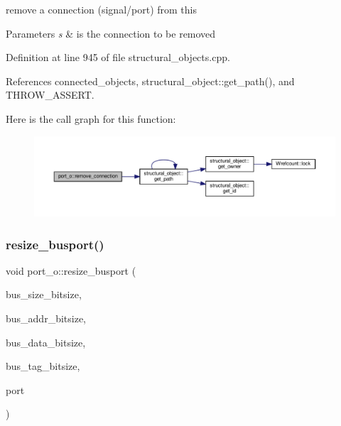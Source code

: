 remove a connection (signal/port) from this 


\begin{DoxyParams}{Parameters}
{\em s} & is the connection to be removed \\
\hline
\end{DoxyParams}


Definition at line 945 of file structural\+\_\+objects.\+cpp.



References connected\+\_\+objects, structural\+\_\+object\+::get\+\_\+path(), and T\+H\+R\+O\+W\+\_\+\+A\+S\+S\+E\+RT.

Here is the call graph for this function\+:
\nopagebreak
\begin{figure}[H]
\begin{center}
\leavevmode
\includegraphics[width=350pt]{df/d75/structport__o_a3f83bbe84dd1283961d15cda2850bcad_cgraph}
\end{center}
\end{figure}
\mbox{\label{structport__o_a4ad62789833bedbad40db7f2dba65fc6}} 
\subsubsection{\texorpdfstring{resize\+\_\+busport()}{resize\_busport()}}
{\footnotesize\ttfamily void port\+\_\+o\+::resize\+\_\+busport (\begin{DoxyParamCaption}\item[{unsigned int}]{bus\+\_\+size\+\_\+bitsize,  }\item[{unsigned int}]{bus\+\_\+addr\+\_\+bitsize,  }\item[{unsigned int}]{bus\+\_\+data\+\_\+bitsize,  }\item[{unsigned int}]{bus\+\_\+tag\+\_\+bitsize,  }\item[{\hyperlink{structural__objects_8hpp_a8ea5f8cc50ab8f4c31e2751074ff60b2}{structural\+\_\+object\+Ref}}]{port }\end{DoxyParamCaption})\hspace{0.3cm}{\ttfamily [static]}}



